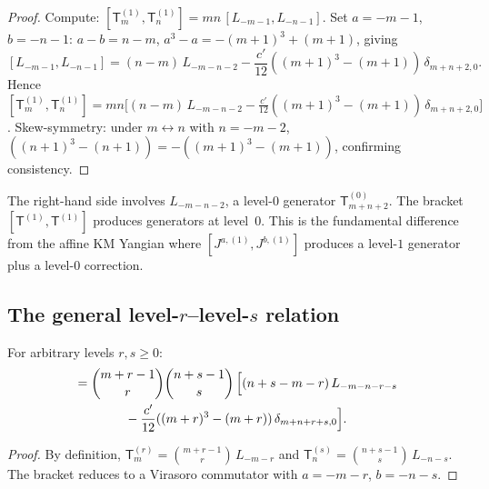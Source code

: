 \documentclass[11pt]{article}
\begin{document}
\begin{proof}
Compute:
$[\mathsf{T}_m^{(1)}, \mathsf{T}_n^{(1)}]
= mn\,[L_{-m-1}, L_{-n-1}]$.
Set $a=-m-1$, $b=-n-1$: $a - b = n - m$,
$a^3 - a = -(m+1)^3 + (m+1)$, giving
\[
[L_{-m-1},L_{-n-1}]
= (n-m)\,L_{-m-n-2}
   - \frac{c'}{12}((m+1)^3-(m+1))\,\delta_{m+n+2,0}.
\]
Hence $[\mathsf{T}_m^{(1)}, \mathsf{T}_n^{(1)}]
= mn\bigl[(n-m)\,L_{-m-n-2}
- \frac{c'}{12}((m+1)^3-(m+1))\,\delta_{m+n+2,0}\bigr]$.
Skew-symmetry: under $m \leftrightarrow n$ with $n = -m-2$,
$((n+1)^3-(n+1)) = -((m+1)^3-(m+1))$, confirming consistency.
\end{proof}

\begin{remark}
The right-hand side involves $L_{-m-n-2}$, a level-$0$ generator
$\mathsf{T}_{m+n+2}^{(0)}$.  The bracket
$[\mathsf{T}^{(1)}, \mathsf{T}^{(1)}]$ produces generators at
level~$0$.  This is the fundamental difference from the affine KM
Yangian where $[J^{a,(1)}, J^{b,(1)}]$ produces a level-$1$
generator plus a level-$0$ correction.
\end{remark}


\subsection{The general level-$r$--level-$s$ relation}

\begin{theorem}
\label{thm:gy-rs-bracket}
For arbitrary levels $r,s \ge 0$:
\begin{align}
[\mathsf{T}_m^{(r)},\,\mathsf{T}_n^{(s)}]
&= \binom{m+r-1}{r}\binom{n+s-1}{s}\,\Bigl[
  (n+s-m-r)\,L_{-m-n-r-s} \notag\\
&\qquad\qquad
  - \frac{c'}{12}((m+r)^3-(m+r))\,\delta_{m+n+r+s,0}
\Bigr].
\label{eq:gy-rs-bracket}
\end{align}
\end{theorem}

\begin{proof}
By definition, $\mathsf{T}_m^{(r)} = \binom{m+r-1}{r}\,L_{-m-r}$
and $\mathsf{T}_n^{(s)} = \binom{n+s-1}{s}\,L_{-n-s}$.  The bracket
reduces to a Virasoro commutator with $a = -m-r$, $b = -n-s$.
\end{proof}
\end{document}
